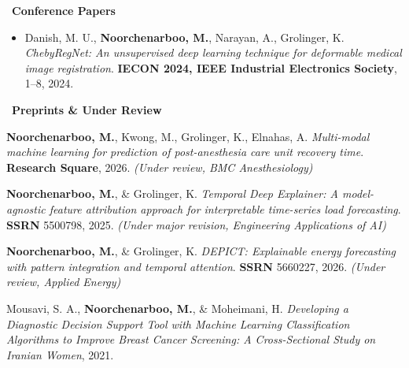 \documentclass[10pt,a4paper,ragged2e]{altacv}
\begin{document}
\vspace{-2mm}
\divider

\textcolor{VividPurple}{\faUsers\ \textbf{Conference Papers}}
\begin{itemize}
\item Danish, M. U., \textbf{Noorchenarboo, M.}, Narayan, A., Grolinger, K. \textit{ChebyRegNet: An unsupervised deep learning technique for deformable medical image registration}. \textbf{IECON 2024, IEEE Industrial Electronics Society}, 1--8, 2024.
\end{itemize}

\vspace{-2mm}
\divider

\textcolor{VividPurple}{\faClockO\ \textbf{Preprints \& Under Review}}
\begin{itemize}
\item \textbf{Noorchenarboo, M.}, Kwong, M., Grolinger, K., Elnahas, A. \textit{Multi-modal machine learning for prediction of post-anesthesia care unit recovery time}. \textbf{Research Square}, 2026. \textit{(Under review, BMC Anesthesiology)}

\item \textbf{Noorchenarboo, M.}, \& Grolinger, K. \textit{Temporal Deep Explainer: A model-agnostic feature attribution approach for interpretable time-series load forecasting}. \textbf{SSRN} 5500798, 2025. \textit{(Under major revision, Engineering Applications of AI)}

\item \textbf{Noorchenarboo, M.}, \& Grolinger, K. \textit{DEPICT: Explainable energy forecasting with pattern integration and temporal attention}. \textbf{SSRN} 5660227, 2026. \textit{(Under review, Applied Energy)}

{\fontsize{8.9}{8}\selectfont
\item Mousavi, S. A., \textbf{Noorchenarboo, M.}, \& Moheimani, H. \textit{Developing a Diagnostic Decision Support Tool with Machine Learning Classification Algorithms to Improve Breast Cancer Screening: A Cross-Sectional Study on Iranian Women}, 2021.
}
\end{itemize}

\clearpage
\end{document}
